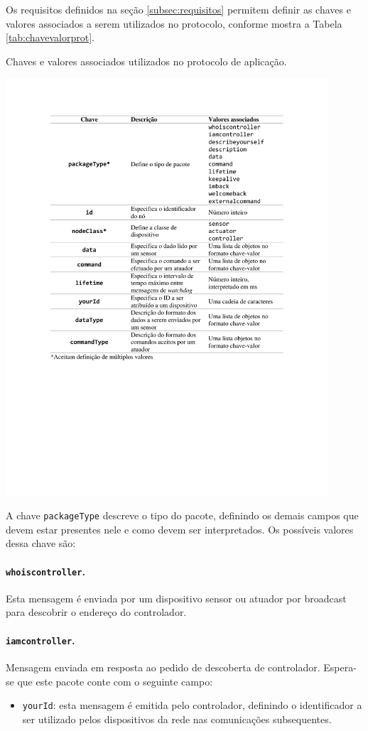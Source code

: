 Os requisitos definidos na seção \ref{subsec:requisitos} permitem definir as chaves e valores associados a serem utilizados no protocolo, conforme mostra a Tabela \ref{tab:chavevalorprot}.

\begin{table}[h]
	\centering
	\caption{Chaves e valores associados utilizados no protocolo de aplicação.}\smallskip
	\label{tab:chavevalorprot}
	\includegraphics[width=0.9\textwidth]{tabelas/chave_valor_prot.pdf}
\end{table}

A chave \texttt{packageType} descreve o tipo do pacote, definindo os demais campos que devem estar presentes nele e como devem ser interpretados. Os possíveis valores dessa chave são:

\paragraph*{\texttt{whoiscontroller}.} Esta mensagem é enviada por um dispositivo sensor ou atuador  por broadcast para descobrir o endereço do controlador. 

\paragraph*{\texttt{iamcontroller}.} Mensagem enviada em resposta ao pedido de descoberta de controlador. Espera-se que este pacote conte com o seguinte campo:
\begin{itemize}
	\item \texttt{yourId}: esta mensagem é emitida pelo controlador, definindo o identificador a ser utilizado pelos dispositivos da rede nas comunicações subsequentes.
\end{itemize}

